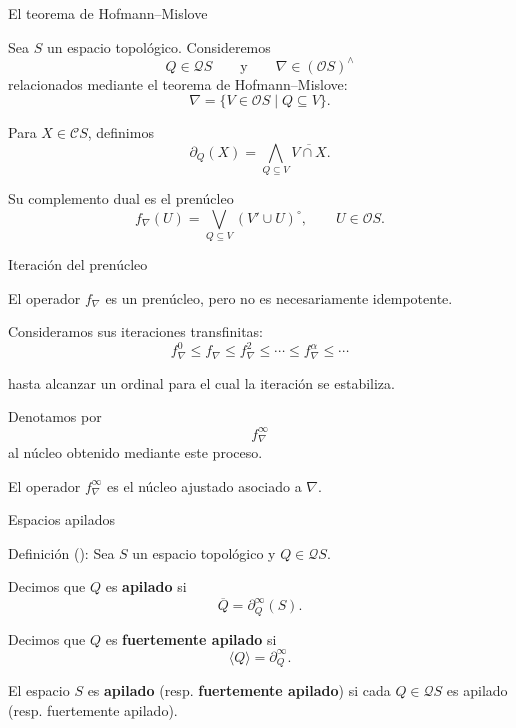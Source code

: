 \documentclass[compress,12pt]{beamer}
\begin{document}
\begin{frame}{El teorema de Hofmann--Mislove}

Sea \(S\) un espacio topológico. Consideremos
\[
    Q\in\mathcal{Q}S
    \qquad\text{y}\qquad
    \nabla\in(\mathcal{O}S)^\wedge
\]
relacionados mediante el teorema de Hofmann--Mislove:
\[
    \nabla
    =
    \{V\in\mathcal{O}S\mid Q\subseteq V\}.
\]

Para \(X\in\mathcal{C}S\), definimos
\[
    \partial_Q(X)
    =
    \bigwedge_{Q\subseteq V}
    \overline{V\cap X}.
\]

Su complemento dual es el prenúcleo
\[
    f_\nabla(U)
    =
    \bigvee_{Q\subseteq V}
    (V'\cup U)^\circ,
    \qquad U\in\mathcal{O}S.
\]

\end{frame}

\begin{frame}{Iteración del prenúcleo}

El operador \(f_\nabla\) es un prenúcleo, pero no es
necesariamente idempotente.

Consideramos sus iteraciones transfinitas:
\[
    f_\nabla^0
    \leq
    f_\nabla
    \leq
    f_\nabla^2
    \leq
    \cdots
    \leq
    f_\nabla^\alpha
    \leq
    \cdots
\]

hasta alcanzar un ordinal para el cual la iteración se estabiliza.

Denotamos por
\[
    \boxed{f_\nabla^\infty}
\]
al núcleo obtenido mediante este proceso.

El operador \(f_\nabla^\infty\) es el
núcleo ajustado asociado a \(\nabla\).

\end{frame}

\begin{frame}{Espacios apilados}
\begin{block}{Definición (\cite{sexton2006ordinal}):}
Sea \(S\) un espacio topológico y \(Q\in\mathcal{Q}S\).

\vspace{0.3cm}

Decimos que \(Q\) es \textbf{apilado} si
\[
    \boxed{
        \overline{Q}=\partial_Q^\infty(S)
    }.
\]

Decimos que \(Q\) es \textbf{fuertemente apilado} si
\[
    \boxed{
        \langle Q\rangle=\partial_Q^\infty
    }.
\]

El espacio \(S\) es \textbf{apilado} (resp. \textbf{fuertemente
apilado}) si cada \(Q\in\mathcal{Q}S\) es apilado
(resp. fuertemente apilado).
\end{block}
\end{frame}
\end{document}
